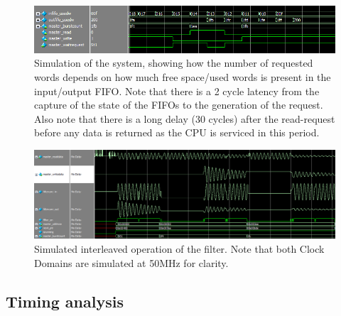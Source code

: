 \documentclass[]{article}
\begin{document}
\begin{figure}[p]
	\begin{center}
		\includegraphics[width = \textwidth]{usedwords_burstcount.PNG}
	\end{center}
	\caption{Simulation of the system, showing how the number of requested words depends on how much free space/used words is present in the input/output FIFO. Note that there is a 2 cycle latency from the capture of the state of the FIFOs to the generation of the request. Also note that there is a long delay (30 cycles) after the read-request before any data is returned as the CPU is serviced in this period.}
	\label{fig:usedwords_burstcount}
\end{figure}

\begin{figure}[p]
	\begin{center}
		\includegraphics[width = \textwidth]{notchfilter_read_and_write_cropped.png}
	\end{center}
	\caption{Simulated interleaved operation of the filter. Note that both Clock Domains are simulated at 50MHz for clarity.}
	\label{fig:interleaved_sim}
\end{figure}



\subsection{Timing analysis} %
\label{sub:timing_analysis}
\end{document}
